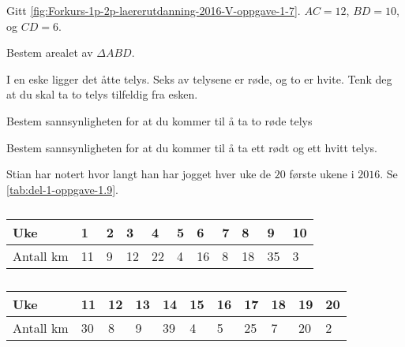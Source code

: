 Gitt \cref{fig:Forkurs-1p-2p-laererutdanning-2016-V-oppgave-1-7}. $AC=12$,
$BD=10$, og $CD=6$. \bigskip

Bestem arealet av $\Delta ABD$.


\Oppgave[2]

I en eske ligger det åtte telys. Seks av telysene er røde, og to er hvite.
Tenk deg at du skal ta to telys tilfeldig fra esken.

\begin{oppgaver}
   Bestem sannsynligheten for at du kommer til å ta to røde telys
\end{oppgaver}

\begin{oppgaver}
   Bestem sannsynligheten for at du kommer til å ta ett rødt og ett
    hvitt telys.
\end{oppgaver}


\Oppgave[2]

Stian har notert hvor langt han har jogget hver uke de $20$ første ukene i
$2016$. Se \cref{tab:del-1-oppgave-1.9}.

\begin{table}[H]
  \centering
  \begin{tabularx}{\textwidth}{| l | *{10}{Z} |}
    \hline
    \Cellcolor Uke               &  1 & 2 &  3 &  4 & 5 &  6 & 7 &  8 &  9 & 10 \\
    \hline
    \Cellcolor Antall $\si{\km}$ & 11 & 9 & 12 & 22 & 4 & 16 & 8 & 18 & 35 &  3 \\
    \hline
  \end{tabularx} \bigskip

  \begin{tabularx}{\textwidth}{| l | *{10}{Z} |}
    \hline
    \Cellcolor Uke               & 11 & 12 & 13 & 14 & 15 &  16 & 17 &  18 & 19 & 20 \\
    \hline
    \Cellcolor Antall $\si{\km}$ & 30 &  8 &  9 & 39 &  4 &   5 & 25 &   7 & 20 &  2 \\
    \hline
  \end{tabularx}
  \caption{}
  \label{tab:Forkurs-1p-2p-laererutdanning-2016-V-oppgave-1-9a}
\end{table}


